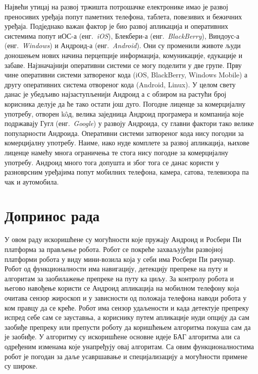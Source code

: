 \documentclass[12pt,oneside]{memoir}
\theoremstyle{remark}
\begin{document}
Највећи утицај на развој тржишта потрошачке електронике имао је развој преносивих уређаја попут паметних телефона, таблета, повезивих и бежичних уређаја. Подједнако важан фактор је био развој апликација и оперативних системима попут иОС-а (енг.~{\em iOS}), Блекбери-а (енг.~{\em BlackBerry}), Виндоус-а (енг.~{\em Windows}) и Андроид-а (енг.~{\em Android}). Они су променили животе људи доношењем нових начина перцепције информација, комуникације, едукације и забаве. Најзначајнији оперативни системи се могу поделити у две групе. Прву чине оперативни системи затвореног кода (iOS, BlackBerry, Windows Mobile) а другу оперативних система отвореног кода (Android, Linux). У целом свету данас је убедљиво најзаступљенији Андроид а с обзиром на растући број корисника делује да ће тако остати још дуго. Погодне лиценце за комерцијалну употребу, отворен k\^{o}д, велика заједница Андроид програмера и компанија које подржавају Гугл (енг.~{\em Google}) у развоју Андроида, су главни фактори тако велике популарности Андроида. Оперативни системи затвореног кода нису погодни за комерцијалну употребу. Наиме, иако нуде комплете за развој апликација, њихове лиценце намећу многа ограничења те стога нису погодне за комерцијалну употребу. Андроид много тога допушта  и због тога се данас користи у разноврсним уређајима попут мобилних телефона, камера, сатова, телевизора па чак и аутомобила.

\section{Допринос рада}
У овом раду искоришћене су могућности које пружају Андроид и Росбери Пи платформа за прављење робота. Робот се покреће захваљујући развојној платформи робота у виду мини-возила која у себи има Росбери Пи рачунар. Робот од функционалности има навигацију, детекцију препреке на путу и алгоритам за заобилажење препреке на путу ка циљу. За контролу робота и његово навођење користи се Андроид апликација на мобилном телефону која очитава сензор жироскоп и у зависности од положаја телефона наводи робота у ком правцу да се креће. Робот има сензор удаљености и када детектује препреку испред себе сам се зауставња, а кориснику путем апликације нуди опцију да сам заобиђе препреку или препусти роботу да коришћењем алгоритма покуша сам да је заобиђе. У алгоритму су искоришћене основне идеје БАГ алгоритма али са одређеним изменама које унапређују овај алгоритам. Са овим функционалностима робот је погодан за даље усавршавање и специјализацију а могућности примене су широке. 
\end{document}
